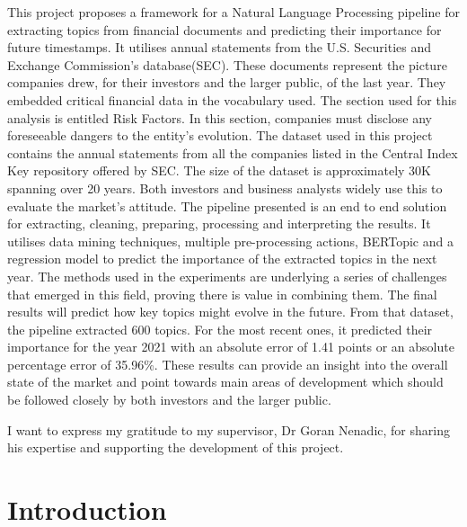 \documentclass[12pt,MSc,a4paper,oneside]{muthesis}
\begin{document}
This project proposes a framework for a Natural Language Processing pipeline for extracting topics from financial documents and predicting their importance for future timestamps. It utilises annual statements from the U.S. Securities and Exchange Commission's database(SEC). These documents represent the picture companies drew, for their investors and the larger public, of the last year. They embedded critical financial data in the vocabulary used. The section used for this analysis is entitled Risk Factors. In this section, companies must disclose any foreseeable dangers to the entity's evolution. The dataset used in this project contains the annual statements from all the companies listed in the Central Index Key repository offered by SEC. The size of the dataset is approximately 30K spanning over 20 years. Both investors and business analysts widely use this to evaluate the market's attitude.
The pipeline presented is an end to end solution for extracting, cleaning, preparing, processing and interpreting the results. It utilises data mining techniques, multiple pre-processing actions, BERTopic and a regression model to predict the importance of the extracted topics in the next year.
The methods used in the experiments are underlying a series of challenges that emerged in this field, proving there is value in combining them. The final results will predict how key topics might evolve in the future. From that dataset, the pipeline extracted 600 topics. For the most recent ones, it predicted their importance for the year 2021 with an absolute error of 1.41 points or an absolute percentage error of 35.96\%. These results can provide an insight into the overall state of the market and point towards main areas of development which should be followed closely by both investors and the larger public.

\afterabstract

I want to express my gratitude to my supervisor, Dr Goran Nenadic, for sharing his expertise and supporting the development of this project.

\afterpreface

\chapter{Introduction}
\end{document}
